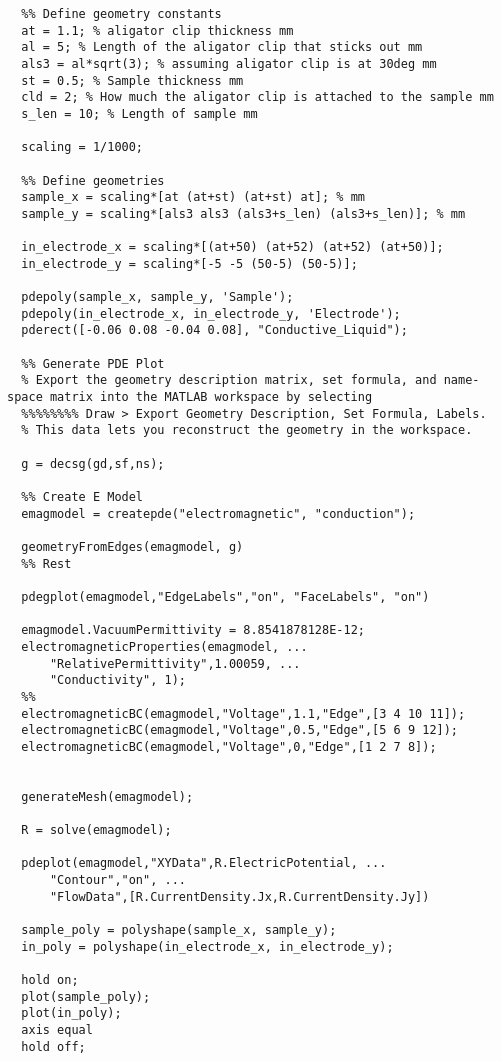 
\begin{lstlisting}
  %% Define geometry constants
  at = 1.1; % aligator clip thickness mm
  al = 5; % Length of the aligator clip that sticks out mm
  als3 = al*sqrt(3); % assuming aligator clip is at 30deg mm
  st = 0.5; % Sample thickness mm
  cld = 2; % How much the aligator clip is attached to the sample mm
  s_len = 10; % Length of sample mm

  scaling = 1/1000;

  %% Define geometries
  sample_x = scaling*[at (at+st) (at+st) at]; % mm
  sample_y = scaling*[als3 als3 (als3+s_len) (als3+s_len)]; % mm

  in_electrode_x = scaling*[(at+50) (at+52) (at+52) (at+50)];
  in_electrode_y = scaling*[-5 -5 (50-5) (50-5)];

  pdepoly(sample_x, sample_y, 'Sample');
  pdepoly(in_electrode_x, in_electrode_y, 'Electrode');
  pderect([-0.06 0.08 -0.04 0.08], "Conductive_Liquid");

  %% Generate PDE Plot
  % Export the geometry description matrix, set formula, and name-space matrix into the MATLAB workspace by selecting
  %%%%%%%% Draw > Export Geometry Description, Set Formula, Labels.
  % This data lets you reconstruct the geometry in the workspace.

  g = decsg(gd,sf,ns);

  %% Create E Model
  emagmodel = createpde("electromagnetic", "conduction");

  geometryFromEdges(emagmodel, g)
  %% Rest

  pdegplot(emagmodel,"EdgeLabels","on", "FaceLabels", "on")

  emagmodel.VacuumPermittivity = 8.8541878128E-12;
  electromagneticProperties(emagmodel, ...
      "RelativePermittivity",1.00059, ...
      "Conductivity", 1);
  %%
  electromagneticBC(emagmodel,"Voltage",1.1,"Edge",[3 4 10 11]);
  electromagneticBC(emagmodel,"Voltage",0.5,"Edge",[5 6 9 12]);
  electromagneticBC(emagmodel,"Voltage",0,"Edge",[1 2 7 8]);


  generateMesh(emagmodel);

  R = solve(emagmodel);

  pdeplot(emagmodel,"XYData",R.ElectricPotential, ...
      "Contour","on", ...
      "FlowData",[R.CurrentDensity.Jx,R.CurrentDensity.Jy])

  sample_poly = polyshape(sample_x, sample_y);
  in_poly = polyshape(in_electrode_x, in_electrode_y);

  hold on;
  plot(sample_poly);
  plot(in_poly);
  axis equal
  hold off;

\end{lstlisting}
